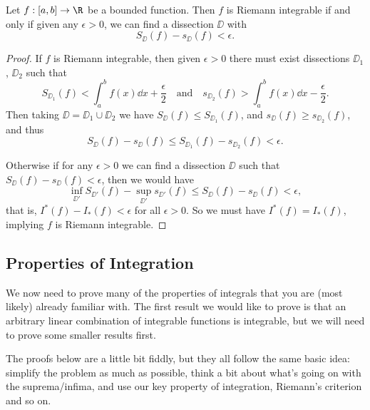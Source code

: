 \documentclass[a4paper]{scrartcl}
\begin{document}
\begin{theorem}
	Let $f:[a, b] \rightarrow \R$ be a bounded function. Then $f$ is Riemann integrable if and only if given any $\epsilon>0$, we can find a dissection $\DD$ with
	$$
	S_\DD(f) - s_\DD(f) < \epsilon.
	$$
\end{theorem}
\begin{proof}
	If $f$ is Riemann integrable, then given $\epsilon > 0$ there must exist dissections $\DD_1$, $\DD_2$ such that
	$$
	S_{\DD_1}(f) < \int_a^b f(x) \dd x + \frac{\epsilon}{2} \quad \text{and} \quad s_{\DD_2}(f) > \int_a^b f(x) \dd x - \frac{\epsilon}{2}.
	$$
	Then taking $\DD = \DD_1 \cup \DD_2$ we have $S_{\DD}(f) \leq S_{\DD_1}(f)$, and $s_{\DD}(f) \geq s_{\DD_2}(f)$, and thus
	$$
	S_\DD(f) - s_\DD(f) \leq S_{\DD_1}(f) - s_{\DD_2}(f) < \epsilon.
	$$

	Otherwise if for any $\epsilon > 0$ we can find a dissection $\DD$ such that $S_{\DD}(f) - s_{\DD}(f) < \epsilon$, then we would have
	$$
	\inf_{\DD'} S_{\DD'}(f) - \sup_{\DD'} s_{\DD'}(f) \leq S_{\DD}(f) - s_{\DD}(f) < \epsilon,
	$$
	that is, $I^*(f) - I_*(f) < \epsilon$ for all $\epsilon > 0$. So we must have $I^*(f) = I_*(f)$, implying $f$ is Riemann integrable.
\end{proof}


\subsection{Properties of Integration}

We now need to prove many of the properties of integrals that you are (most likely) already familiar with. The first result we would like to prove is that an arbitrary linear combination of integrable functions is integrable, but we will need to prove some smaller results first.

The proofs below are a little bit fiddly, but they all follow the same basic idea: simplify the problem as much as possible, think a bit about what's going on with the suprema/infima, and use our key property of integration, Riemann's criterion and so on. 
\end{document}
